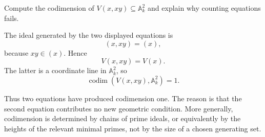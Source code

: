 \begin{problem}\label{prob:vi31-08}
Compute the codimension of \(V(x,xy)\subseteq\mathbb A^2_k\) and explain why counting equations fails.
\end{problem}

\ifdefined\FullProblemDossiers
\begin{solution}
The ideal generated by the two displayed equations is
\[
(x,xy)=(x),
\]
because \(xy\in(x)\). Hence
\[
V(x,xy)=V(x).
\]
The latter is a coordinate line in \(\mathbb A^2_k\), so
\[
\operatorname{codim}(V(x,xy),\mathbb A^2_k)=1.
\]

Thus two equations have produced codimension one. The reason is that the second equation contributes no new
geometric condition. More generally, codimension is determined by chains of prime ideals, or equivalently by
the heights of the relevant minimal primes, not by the size of a chosen generating set.
\end{solution}
\fi
